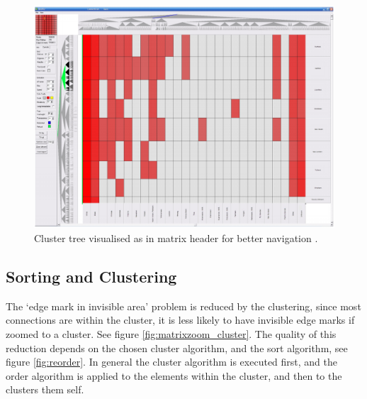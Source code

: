 \begin{figure}[h]
\centering
\includegraphics[width=\textwidth]{images/matrixzoom_abello}
\caption{Cluster tree visualised as in matrix header for better navigation \citep{abello2004}. \label{fig:matrixzoom_abello}}
\end{figure}





\subsection{Sorting and Clustering}   

The ‘edge mark in invisible area' problem is reduced by the clustering, since most connections are within the cluster, it is less likely to have invisible edge marks if zoomed to a cluster. See figure \ref{fig:matrixzoom_cluster}. 
The quality of this reduction depends on the chosen cluster algorithm, and the sort algorithm, see figure \ref{fig:reorder}. In general the cluster algorithm is executed first, and the order algorithm is applied to the elements within the cluster, and then to the clusters them self.

